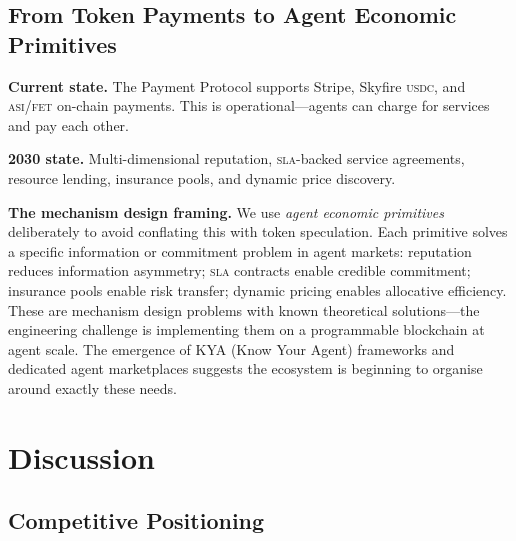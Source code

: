 \documentclass[twoside,11pt]{article}
\begin{document}
\subsection{From Token Payments to Agent Economic Primitives}
\label{subsec:path-economy}

\textbf{Current state.} The Payment Protocol supports Stripe, Skyfire
\textsc{usdc}, and \textsc{asi}/\textsc{fet} on-chain payments.  This is
operational---agents can charge for services and pay each other.

\textbf{2030 state.} Multi-dimensional reputation, \textsc{sla}-backed service
agreements, resource lending, insurance pools, and dynamic price discovery.

\textbf{The mechanism design framing.} We use \emph{agent economic primitives}
deliberately to avoid conflating this with token speculation.  Each primitive
solves a specific information or commitment problem in agent markets:
reputation reduces information asymmetry; \textsc{sla} contracts enable
credible commitment; insurance pools enable risk transfer; dynamic pricing
enables allocative efficiency.  These are mechanism design problems
\citep{myerson2007mechanism} with known theoretical solutions---the engineering
challenge is implementing them on a programmable blockchain at agent scale.
The emergence of KYA (Know Your Agent) frameworks \citep{chainup2026kya} and
dedicated agent marketplaces \citep{agenticmarket2026} suggests the ecosystem
is beginning to organise around exactly these needs.

\section{Discussion}
\label{sec:discussion}

\subsection{Competitive Positioning}
\label{subsec:competitive}
\end{document}
